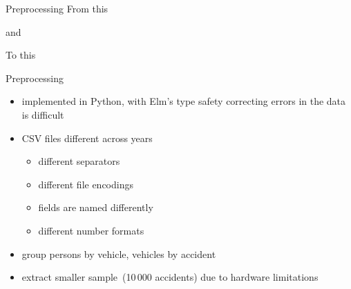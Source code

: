 \documentclass[english]{mlutalk}
\begin{document}
\begin{frame}{Preprocessing}
  From this\textellipsis
  
  and\textellipsis
  
  \vspace{3ex}
  To this\textellipsis
  
\end{frame}
\begin{frame}{Preprocessing}
  \begin{itemize}
    \setlength{\itemsep}{2ex}
    \item implemented in Python, with Elm's type safety correcting errors in the data is difficult
    \item CSV files different across years
    \begin{itemize}
      \item different separators
      \item different file encodings
      \item fields are named differently
      \item different number formats
    \end{itemize}
    \item group persons by vehicle, vehicles by accident
    \item extract smaller sample~(10\,000 accidents) due to hardware limitations
  \end{itemize}
\end{frame}
\end{document}
